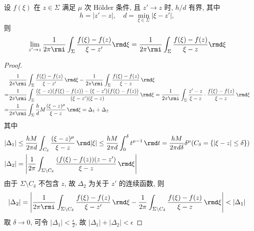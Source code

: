 \begin{lemma}
    设  $ f(\xi) $ 在 $ z \in \Sigma$ 满足 $ \mu $ 次 H\"older 条件, 且 $ z' \to z$ 时, $ h/d $ 有界, 其中
    \begin{equation}
        h = | z' - z|, \quad d = \min_{\xi \in \Sigma} |\xi - z' | ,
    \end{equation} 则
    \begin{equation}
        \lim_{z' \to z} \frac{1}{2 \pi \rmi} \int_{\Sigma} \frac{f(\xi) - f(z)}{\xi - z'} \rmd \xi = \frac{1}{2 \pi \rmi} \int_{\Sigma} \frac{f(\xi) - f(z)}{\xi - z} \rmd \xi
    \end{equation}
\end{lemma}
\begin{proof}
    \begin{equation}
        \begin{aligned}
              & \frac{1}{2 \pi \rmi} \int_{\Sigma} \frac{f(\xi) - f(z)}{\xi - z'} \,\rmd \xi - \frac{1}{2 \pi \rmi} \int_{\Sigma} \frac{f(\xi) - f(z)}{\xi - z} \,\rmd \xi                                                                              \\
            = & \frac{1}{2\pi \rmi} \int_{\Sigma} \frac{(\xi - z)(f(\xi) - f(z)) -(\xi - z')(f(\xi) - f(z)) }{(\xi - z')(\xi - z)} \,\rmd \xi = \frac{1}{2\pi \rmi} \int_{\Sigma} \frac{z' - z}{\xi - z} \cdot \frac{f(\xi) - f(z)}{\xi - z} \,\rmd \xi \\
            = & \frac{1}{2\pi \rmi} \int_{\Sigma} \frac{h}{d} M \frac{(\xi - z)^{\mu}}{\xi - z} \, \rmd \xi = \Delta_{1} + \Delta_{2}
        \end{aligned}
    \end{equation}
    其中
    \begin{equation}
        \begin{aligned}
            | \Delta_{1} | & \leq \frac{hM}{2 \pi d} \int_{C_{\delta}} \frac{(\xi - z)^{\mu}}{\xi - z} \, \rmd | \xi | \leq \frac{hM}{2 \pi d} \int_{0}^{\delta} t^{\mu - 1} \, \rmd t = \frac{hM}{2 \pi d \delta} \delta^{\mu} (C_{\delta} = \{ | \xi - z | \leq \delta \} ) \\
            | \Delta_{2} | & =  \left| \frac{1}{2\pi} \int_{\Sigma \setminus  C_{\delta}} \frac{(f(\xi) - f(z))(z-z')}{\xi - z} \, \rmd \xi \right|
        \end{aligned}
    \end{equation}
    由于 $ \Sigma \setminus  C_{\delta} $ 不包含 $ z $, 故 $ \Delta_2 $ 为关于 $ z' $ 的连续函数, 则
    \begin{equation}
        | \Delta_{2} | =  \left| \frac{1}{2\pi \rmi} \int_{\Sigma \setminus  C_{\delta}} \frac{f(\xi) - f(z)}{\xi - z'} \, \rmd \xi - \frac{1}{2\pi} \int_{\Sigma \setminus  C_{\delta}} \frac{f(\xi) - f(z)}{\xi - z} \, \rmd \xi \right| < | \Delta_1 |
    \end{equation}
    取 $ \delta \to 0 $, 可令 $ | \Delta_1 | < \frac{\epsilon}{2} $, 故 $ | \Delta_1 | + | \Delta_2 | < \epsilon $
\end{proof}

